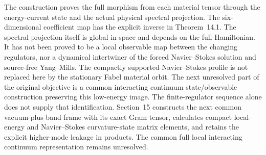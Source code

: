 The construction proves the full morphism from each material tensor
through the energy-current state and the actual physical spectral
projection. The six-dimensional coefficient map has the explicit inverse
in Theorem~14.1. The spectral projection itself is global in space and
depends on the full Hamiltonian. It has not been proved to be a local
observable map between the changing regulators, nor a dynamical
intertwiner of the forced Navier--Stokes solution and source-free
Yang--Mills. The compactly supported Navier--Stokes profile is not
replaced here by the stationary Fabel material orbit. The next
unresolved part of the original objective is a common interacting
continuum state/observable construction preserving this low-energy
image. The finite-regulator sequence alone does not supply that
identification. Section~15 constructs the next common vacuum-plus-band
frame with its exact Gram tensor, calculates compact local-energy and
Navier--Stokes curvature-state matrix elements, and retains the explicit
higher-mode leakage in products. The common full local interacting
continuum representation remains unresolved.
